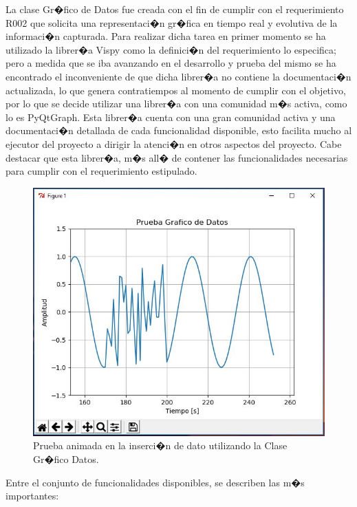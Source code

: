 La clase Gr�fico de Datos fue creada con el fin de cumplir con el requerimiento R002 que solicita una representaci�n gr�fica en tiempo real y evolutiva de la informaci�n capturada. Para realizar dicha tarea en primer momento se ha utilizado la librer�a Vispy como la definici�n del requerimiento lo especifica; pero a medida que se iba avanzando en el desarrollo y prueba del mismo se ha encontrado el inconveniente de que dicha librer�a no contiene la documentaci�n actualizada, lo que genera contratiempos al momento de cumplir con el objetivo, por lo que se decide utilizar una librer�a con una comunidad m�s activa, como lo es PyQtGraph. Esta librer�a cuenta con una gran comunidad activa y una documentaci�n detallada de cada funcionalidad disponible, esto facilita mucho al ejecutor del proyecto a dirigir la atenci�n en otros aspectos del proyecto. Cabe destacar que esta librer�a, m�s all� de contener las funcionalidades necesarias para cumplir con el requerimiento estipulado.
\begin{figure}[h!]
	\centering
	\includegraphics[width=0.7\linewidth, height=0.4\textheight]{Imagenes/GD_prueba}
	\caption{Prueba animada en la inserci�n de dato utilizando la Clase Gr�fico Datos.}
	\label{fig:gdprueba}
\end{figure}
Entre el conjunto de funcionalidades disponibles, se describen las m�s importantes:
